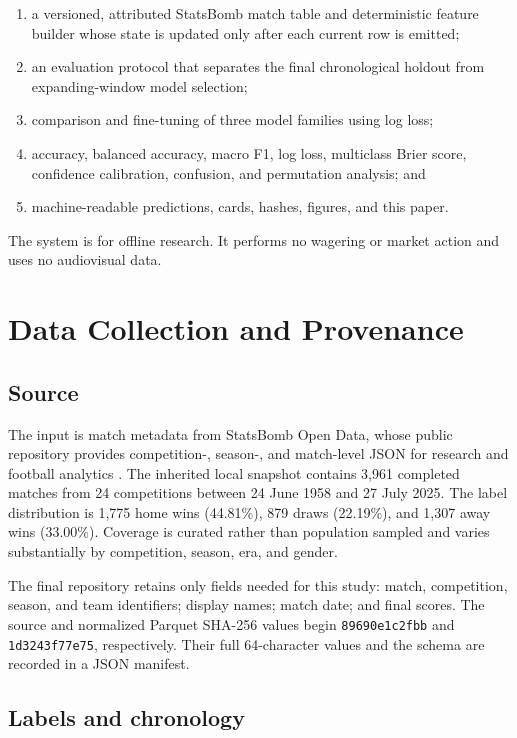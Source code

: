 \documentclass[10pt]{article}
\begin{document}
\begin{enumerate}
  \item a versioned, attributed StatsBomb match table and deterministic feature
  builder whose state is updated only after each current row is emitted;
  \item an evaluation protocol that separates the final chronological holdout
  from expanding-window model selection;
  \item comparison and fine-tuning of three model families using log loss;
  \item accuracy, balanced accuracy, macro F1, log loss, multiclass Brier score,
  confidence calibration, confusion, and permutation analysis; and
  \item machine-readable predictions, cards, hashes, figures, and this paper.
\end{enumerate}

The system is for offline research. It performs no wagering or market action and
uses no audiovisual data.

\section{Data Collection and Provenance}

\subsection{Source}

The input is match metadata from StatsBomb Open Data, whose public repository
provides competition-, season-, and match-level JSON for research and football
analytics \cite{statsbomb}. The inherited local snapshot contains 3,961 completed
matches from 24 competitions between 24 June 1958 and 27 July 2025. The label
distribution is 1,775 home wins (44.81\%), 879 draws (22.19\%), and 1,307 away
wins (33.00\%). Coverage is curated rather than population sampled and varies
substantially by competition, season, era, and gender.

The final repository retains only fields needed for this study: match,
competition, season, and team identifiers; display names; match date; and final
scores. The source and normalized Parquet SHA-256 values begin
\texttt{89690e1c2fbb} and \texttt{1d3243f77e75}, respectively. Their full
64-character values and the schema are recorded in a JSON manifest.

\subsection{Labels and chronology}
\end{document}
